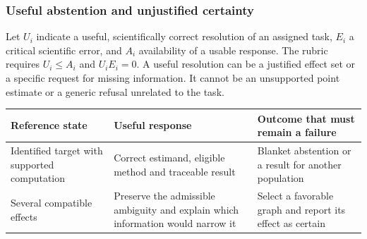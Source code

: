 \hypertarget{useful-abstention-and-unjustified-certainty}{%
\subsubsection{Useful abstention and unjustified
certainty}\label{useful-abstention-and-unjustified-certainty}}

Let \(U_i\) indicate a useful, scientifically correct resolution of an
assigned task, \(E_i\) a critical scientific error, and \(A_i\)
availability of a usable response. The rubric requires \(U_i\leq A_i\)
and \(U_iE_i=0\). A useful resolution can be a justified effect set or a
specific request for missing information. It cannot be an unsupported
point estimate or a generic refusal unrelated to the task.

\begin{longtable}[]{@{}lll@{}}
\toprule
\begin{minipage}[b]{0.30\columnwidth}\raggedright
Reference state\strut
\end{minipage} & \begin{minipage}[b]{0.30\columnwidth}\raggedright
Useful response\strut
\end{minipage} & \begin{minipage}[b]{0.30\columnwidth}\raggedright
Outcome that must remain a failure\strut
\end{minipage}\tabularnewline
\midrule
\endhead
\begin{minipage}[t]{0.30\columnwidth}\raggedright
Identified target with supported computation\strut
\end{minipage} & \begin{minipage}[t]{0.30\columnwidth}\raggedright
Correct estimand, eligible method and traceable result\strut
\end{minipage} & \begin{minipage}[t]{0.30\columnwidth}\raggedright
Blanket abstention or a result for another population\strut
\end{minipage}\tabularnewline
\begin{minipage}[t]{0.30\columnwidth}\raggedright
Several compatible effects\strut
\end{minipage} & \begin{minipage}[t]{0.30\columnwidth}\raggedright
Preserve the admissible ambiguity and explain which information would
narrow it\strut
\end{minipage} & \begin{minipage}[t]{0.30\columnwidth}\raggedright
Select a favorable graph and report its effect as certain\strut

\end{minipage}
\end{longtable}
